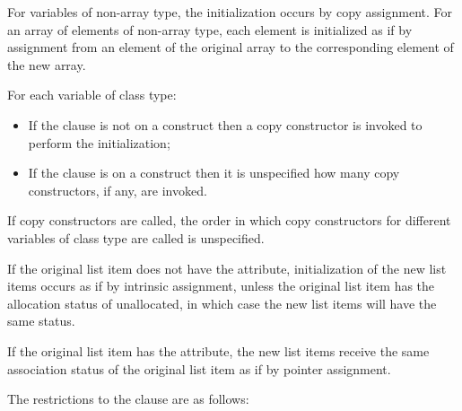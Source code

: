 \begin{ccppspecific}
For variables of non-array type, the initialization occurs by copy assignment. For an
array of elements of non-array type, each element is initialized as if by assignment from
an element of the original array to the corresponding element of the new array.
\end{ccppspecific}
%
\begin{cppspecific}
For each variable of class type:
\begin{itemize}
\item If the  clause is not on a  construct then a copy constructor is invoked to perform the initialization;
\item If the  clause is on a  construct then it is unspecified how many copy constructors, if any, are invoked.
\end{itemize}
If copy constructors are called, the order in which copy constructors for different variables of class type are called is unspecified.
\end{cppspecific}
%
\begin{fortranspecific}
If the original list item does not have the  attribute, initialization of the new
list items occurs as if by intrinsic assignment, unless the original list item has the
allocation status of unallocated, in which case the new list items will have the
same status.

If the original list item has the  attribute, the new list items receive the same
association status of the original list item as if by pointer assignment.
\end{fortranspecific}
%
\restrictions
The restrictions to the  clause are as follows:

